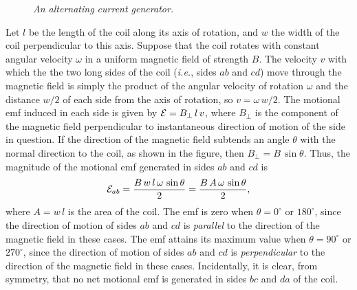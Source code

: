 \begin{figure}
\epsfysize=3in
\centerline{}
\caption{\em An alternating current generator.}\label{f9.5}
\end{figure}

Let $l$ be the length of the coil along its axis of rotation, and $w$ the
width of the coil perpendicular to this axis. Suppose that the
coil rotates with  constant angular velocity $\omega$ in a uniform
magnetic field of strength $B$. The velocity $v$ with which the the two
long sides of the coil ({\em i.e.},  
sides $ab$ and $cd$) move through the magnetic field is simply the product
of the angular velocity of rotation $\omega$ and the distance $w/2$ of each
side from the axis of rotation, so $v = \omega\,w/2$. The motional emf
induced in each side is given by ${\cal E} = B_\perp\,l\,v$, where $B_\perp$ is
the component of the magnetic field perpendicular to instantaneous direction 
of motion of the side in question.
If the direction of the magnetic field subtends an
angle $\theta$ with the normal direction to
the coil, as shown in the figure, then $B_\perp = B\,\sin\theta$. 
Thus, the magnitude of the motional emf generated in sides $ab$ and $cd$
is 
\begin{equation}
{\cal E}_{ab} = \frac{B\, w\, l\, \omega\,\sin\theta}{2} = \frac{B\,A\,
\omega\,\sin\theta}{2},
\end{equation}
where $A=w\,l$ is the area of the coil. 
The emf is zero when $\theta = 0^\circ$ or $180^\circ$, since the
direction of motion of sides $ab$ and $cd$ is {\em parallel}\/ to the direction
of the magnetic field in these cases. The emf attains its maximum value when
$\theta = 90^\circ$ or $270^\circ$, since the direction of motion of
sides $ab$ and $cd$ is {\em perpendicular} to the direction of the magnetic field
in these cases. Incidentally, it is clear, from symmetry, that no net motional
emf is generated in sides $bc$ and $da$ of the coil. 

